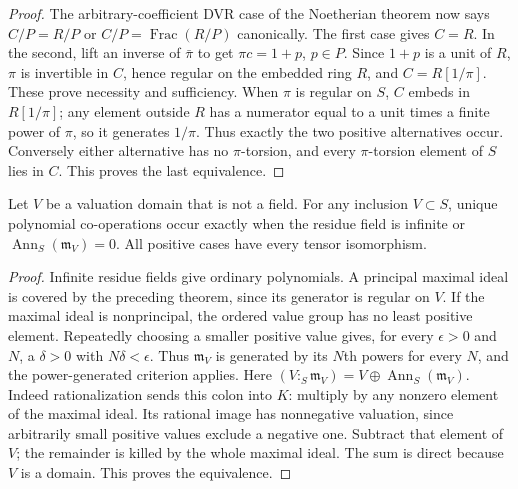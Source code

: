 \begin{proof}
The arbitrary-coefficient DVR case of the Noetherian theorem now
says $C/P=R/P$ or $C/P=\operatorname{Frac}(R/P)$ canonically.
The first case gives $C=R$. In the second, lift an inverse of
$\bar\pi$ to get $\pi c=1+p$, $p\in P$. Since $1+p$ is a unit
of $R$, $\pi$ is invertible in $C$, hence regular on the embedded
ring $R$, and $C=R[1/\pi]$. These prove necessity and sufficiency.
When $\pi$ is regular on $S$, $C$ embeds in $R[1/\pi]$; any
element outside $R$ has a numerator equal to a unit times a
finite power of $\pi$, so it generates $1/\pi$. Thus exactly
the two positive alternatives occur. Conversely either alternative
has no $\pi$-torsion, and every $\pi$-torsion element of $S$ lies
in $C$. This proves the last equivalence.
\end{proof}

\begin{corollary}\label{cor:valuation-arbitrary-coefficients}
Let $V$ be a valuation domain that is not a field. For any inclusion
$V\subset S$, unique polynomial co-operations occur exactly when
the residue field is infinite or
$\operatorname{Ann}_S(\mathfrak m_V)=0$. All positive cases have
every tensor isomorphism.
\end{corollary}
\begin{proof}
Infinite residue fields give ordinary polynomials. A principal
maximal ideal is covered by the preceding theorem, since its
generator is regular on $V$. If the maximal ideal is nonprincipal,
the ordered value group has no least positive element. Repeatedly
choosing a smaller positive value gives, for every $\epsilon>0$
and $N$, a $\delta>0$ with $N\delta<\epsilon$.
Thus $\mathfrak m_V$ is generated by its $N$th powers for every
$N$, and the power-generated criterion applies.
Here $(V:_S\mathfrak m_V)=V\oplus\operatorname{Ann}_S(\mathfrak m_V)$.
Indeed rationalization sends this colon into $K$: multiply by any
nonzero element of the maximal ideal. Its rational image has
nonnegative valuation, since arbitrarily small positive values
exclude a negative one. Subtract that element of $V$; the remainder
is killed by the whole maximal ideal. The sum is direct because
$V$ is a domain. This proves the equivalence.
\end{proof}


